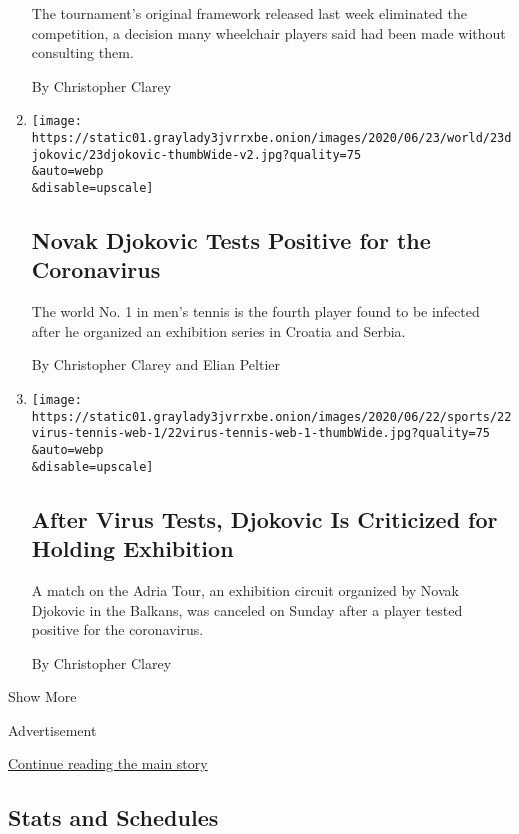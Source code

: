 \begin{enumerate}
  The tournament's original framework released last week eliminated the
  competition, a decision many wheelchair players said had been made
  without consulting them.

  By Christopher Clarey
\item
  \href{/2020/06/23/sports/tennis/novak-djokovic-coronavirus.html}{}

  \texttt{[image: https://static01.graylady3jvrrxbe.onion/images/2020/06/23/world/23djokovic/23djokovic-thumbWide-v2.jpg?quality=75\\\&auto=webp\\\&disable=upscale]}

  \hypertarget{novak-djokovic-tests-positive-for-the-coronavirus}{%
  \subsection{Novak Djokovic Tests Positive for the
  Coronavirus}\label{novak-djokovic-tests-positive-for-the-coronavirus}}

  The world No. 1 in men's tennis is the fourth player found to be
  infected after he organized an exhibition series in Croatia and
  Serbia.

  By Christopher Clarey and Elian Peltier
\item
  \href{/2020/06/22/sports/tennis/djokovic-exhibition-positive-tests-coronavirus.html}{}

  \texttt{[image: https://static01.graylady3jvrrxbe.onion/images/2020/06/22/sports/22virus-tennis-web-1/22virus-tennis-web-1-thumbWide.jpg?quality=75\\\&auto=webp\\\&disable=upscale]}

  \hypertarget{after-virus-tests-djokovic-is-criticized-for-holding-exhibition}{%
  \subsection{After Virus Tests, Djokovic Is Criticized for Holding
  Exhibition}\label{after-virus-tests-djokovic-is-criticized-for-holding-exhibition}}

  A match on the Adria Tour, an exhibition circuit organized by Novak
  Djokovic in the Balkans, was canceled on Sunday after a player tested
  positive for the coronavirus.

  By Christopher Clarey
\end{enumerate}

Show More

Advertisement

\protect\hyperlink{after-mid1}{Continue reading the main story}

\hypertarget{stats-and-schedules}{%
\subsection{Stats and Schedules}\label{stats-and-schedules}}

